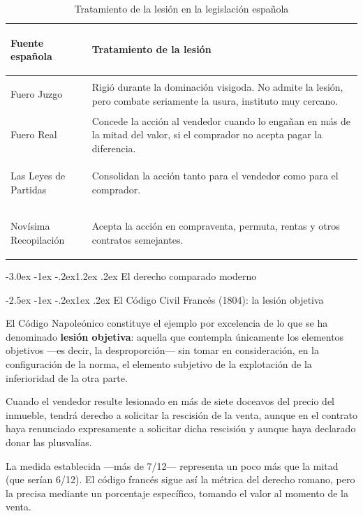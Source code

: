 \documentclass[12pt,oneside]{book}
\makeatletter
\renewcommand\section{\@startsection{section}{1}{\z@}%
  {-3.0ex \@plus -1ex \@minus -.2ex}{1.2ex \@plus .2ex}%
  {\normalfont\large\bfseries\color{acento}}}
\renewcommand\subsection{\@startsection{subsection}{2}{\z@}%
  {-2.5ex \@plus -1ex \@minus -.2ex}{1ex \@plus .2ex}%
  {\normalfont\normalsize\bfseries}}
\makeatother
\begin{document}
\begin{table}[H]
\centering
\caption{Tratamiento de la lesión en la legislación española}
\begin{tabularx}{\textwidth}{>{\bfseries\raggedright\arraybackslash}p{} X}
\toprule
\textbf{Fuente española} & \textbf{Tratamiento de la lesión} \\
\midrule
Fuero Juzgo & Rigió durante la dominación visigoda. No admite la lesión, pero combate seriamente la usura, instituto muy cercano. \\
Fuero Real & Concede la acción al vendedor cuando lo engañan en más de la mitad del valor, si el comprador no acepta pagar la diferencia. \\
Las Leyes de Partidas & Consolidan la acción tanto para el vendedor como para el comprador. \\
Novísima Recopilación & Acepta la acción en compraventa, permuta, rentas y otros contratos semejantes. \\
\bottomrule
\end{tabularx}
\end{table}

\section{El derecho comparado moderno}

\subsection{El Código Civil Francés (1804): la lesión objetiva}

El Código Napoleónico constituye el ejemplo por excelencia de lo que se ha denominado \textbf{lesión objetiva}: aquella que contempla únicamente los elementos objetivos ---es decir, la desproporción--- sin tomar en consideración, en la configuración de la norma, el elemento subjetivo de la explotación de la inferioridad de la otra parte.

\begin{regla}
Cuando el vendedor resulte lesionado en más de siete doceavos del precio del inmueble, tendrá derecho a solicitar la rescisión de la venta, aunque en el contrato haya renunciado expresamente a solicitar dicha rescisión y aunque haya declarado donar las plusvalías.
\end{regla}

La medida establecida ---más de 7/12--- representa un poco más que la mitad (que serían 6/12). El código francés sigue así la métrica del derecho romano, pero la precisa mediante un porcentaje específico, tomando el valor al momento de la venta.
\end{document}
